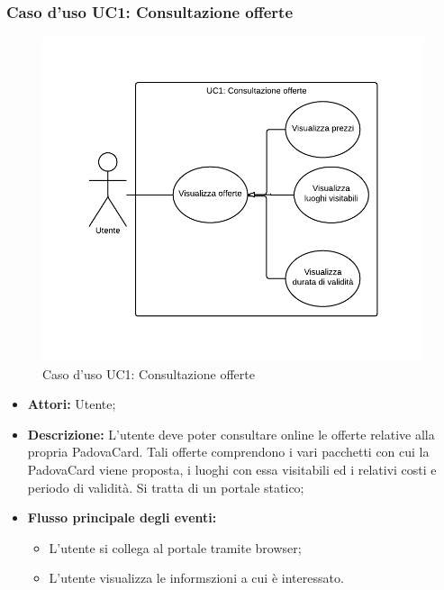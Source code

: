 \subsubsection{Caso d'uso UC1: Consultazione offerte}\label{UC1}
\begin{figure}[H]
\centering
\includegraphics[width=1\textwidth]{images/UC1.png}
\caption{Caso d'uso UC1: Consultazione offerte}
\end{figure}
\begin{itemize}
\item \textbf{Attori:} Utente;
\item \textbf{Descrizione:} L'utente deve poter consultare online le offerte relative alla propria PadovaCard. Tali offerte comprendono i vari pacchetti con cui la PadovaCard viene proposta, i luoghi con essa visitabili ed i relativi costi e periodo di validità. Si tratta di un portale statico;

\item \textbf{Flusso principale degli eventi:}
	\begin{itemize}
		\item L'utente si collega al portale tramite browser;
		\item L'utente visualizza le informszioni a cui è interessato.
	\end{itemize}
\end{itemize}

